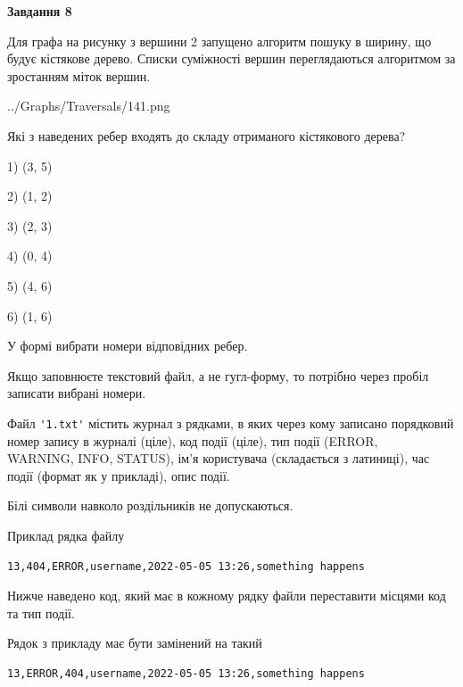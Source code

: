 \documentclass[12pt, ukrainian]{article}
\def\code#1{\Verb!#1!}
\begin{document}
{\begin {large}
{\begin {center}\textbf{Завдання 8}\end {center}}\par
Для графа на рисунку з вершини 2 запущено алгоритм пошуку в ширину, що будує кістякове дерево. Списки суміжності вершин переглядаються алгоритмом за зростанням міток вершин.\par
\begin{center}
	{../Graphs/Traversals/141.png}
\end{center}
\par Які з наведених ребер входять до складу отриманого кістякового дерева?\par
1) (3, 5)\par
2) (1, 2)\par
3) (2, 3)\par
4) (0, 4)\par
5) (4, 6)\par
6) (1, 6)\par
{\vskip 15pt} У формі вибрати номери відповідних ребер.


Якщо заповнюєте текстовий файл, а не гугл-форму, то потрібно через пробіл записа\-ти вибрані номери.\par
\newpage


Файл \code{'1.txt'} містить журнал з рядками, в яких через кому записано поряд\-ко\-вий номер запису в журналі (ціле), код події (ціле), тип події (ERROR,\\ WARNING, INFO, STATUS), ім'я користувача (складається з латиниці), час події (фор\-мат як у прикладі), опис події.

Білі символи навколо роздільників не допускаються.

Приклад рядка файлу



\begin{verbatim}
13,404,ERROR,username,2022-05-05 13:26,something happens
\end{verbatim}


Нижче наведено код, який має в кожному рядку файли переставити місцями код та тип події.

Рядок з прикладу має бути замінений на такий



\begin{verbatim}
13,ERROR,404,username,2022-05-05 13:26,something happens
\end{verbatim}





\end{large}}
\end{document}

